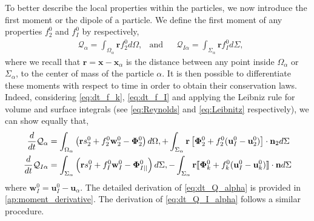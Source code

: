 To better describe the local properties within the particles, we now introduce the first moment or the dipole of a particle.
We define the first moment of any properties $f_2^0$ and $f_I^0$ by respectively,
\begin{align}
    &\mathcal{Q}_\alpha 
    = \int_{\Omega_\alpha} \textbf{r} f_2^0 d\Omega,
    &\text{and}&
    &\mathcal{Q}_{I\alpha}
    = \int_{\Sigma_\alpha} \textbf{r} f_I^0 d\Sigma,
    \label{eq:first_moment_definition}
\end{align}
where we recall that $\textbf{r} = \textbf{x} - \textbf{x}_\alpha$ is the distance between any point inside $\Omega_\alpha$ or $\Sigma_\alpha$, to the center of mass of the particle $\alpha$.
It is then possible to differentiate these moments with respect to time in order to obtain their conservation laws.
Indeed, considering \ref{eq:dt_f_k}, \ref{eq:dt_f_I} and applying the Leibniz rule for volume and surface integrals (see \ref{eq:Reynolds} and \ref{eq:Leibnitz} respectively), we can show equally that,
\begin{align}
    \frac{d}{d t} \mathcal{Q}_\alpha
    &= \int_{\Omega_\alpha} \left(
        \textbf{r} s_2^0         
        + f_2^0  \textbf{w}_2^0 
        - \mathbf{\Phi}_2^0
    \right) d\Omega,
    + \int_{\Sigma_\alpha} \textbf{r} \left[
        \mathbf{\Phi}_2^0
        + f_2^0 (\textbf{u}_I^0-\textbf{u}_2^0)
    \right]\cdot \textbf{n}_2  d\Sigma 
    \label{eq:dt_Q_alpha}\\
    \frac{d}{d t} \mathcal{Q}_{I\alpha}
    &= \int_{\Sigma_\alpha} \left(
        \textbf{r}s_I^0
        + f_I^0 \textbf{w}_I^0
        - \mathbf{\Phi}_{I||}^0
    \right) d\Sigma,
    - \int_{\Sigma_\alpha}\textbf{r} 
    \llbracket \mathbf{\Phi}_k^0
        + f_k^0 (\textbf{u}_I^0 - \textbf{u}_k^0)
     \rrbracket \cdot \textbf{n}
    d\Sigma
    \label{eq:dt_Q_I_alpha}
\end{align}
where $\textbf{w}_I^0 = \textbf{u}_I^0 - \textbf{u}_\alpha$.
The detailed derivation of \ref{eq:dt_Q_alpha} is provided in \ref{ap:moment_derivative}.
The derivation of \ref{eq:dt_Q_I_alpha} follows a similar procedure. 
